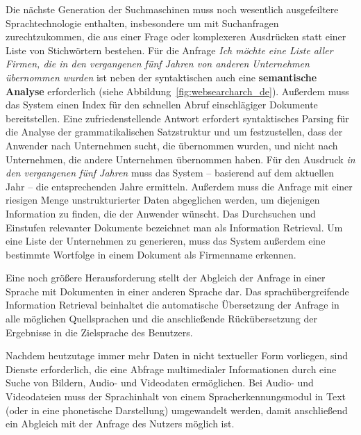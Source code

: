 \begin{multicols}{2}
Die nächste Generation der Suchmaschinen muss noch wesentlich ausgefeiltere Sprachtechnologie enthalten, insbesondere um mit Suchanfragen zurechtzukommen, die aus einer Frage oder komplexeren Ausdrücken statt einer Liste von Stichwörtern bestehen. Für die Anfrage \textit{Ich möchte eine Liste aller Firmen, die in den vergangenen fünf Jahren von anderen Unternehmen übernommen wurden} ist neben der syntaktischen auch eine \textbf{semantische Analyse} erforderlich (siehe Abbildung~\ref{fig:websearcharch_de}). Außerdem muss das System einen Index für den schnellen Abruf einschlägiger Dokumente bereitstellen. Eine zufriedenstellende Antwort erfordert syntaktisches Parsing für die Analyse der grammatikalischen Satzstruktur und um festzustellen, dass der Anwender nach Unternehmen sucht, die übernommen wurden, und nicht nach Unternehmen, die andere Unternehmen übernommen haben. Für den Ausdruck \textit{in den vergangenen fünf Jahren} muss das System -- basierend auf dem aktuellen Jahr -- die entsprechenden Jahre ermitteln. Außerdem muss die Anfrage mit einer riesigen Menge unstrukturierter Daten abgeglichen werden, um diejenigen Information zu finden, die der Anwender wünscht. Das Durchsuchen und Einstufen relevanter Dokumente bezeichnet man als Information Retrieval. Um eine Liste der Unternehmen zu generieren, muss das System außerdem eine bestimmte Wortfolge in einem Dokument als Firmenname erkennen.


Eine noch größere Herausforderung stellt der Abgleich der Anfrage in einer Sprache mit Dokumenten in einer anderen Sprache dar. Das sprachübergreifende Information Retrieval beinhaltet die automatische Übersetzung der Anfrage in alle möglichen Quellsprachen und die anschließende Rückübersetzung der Ergebnisse in die Zielsprache des Benutzers. 

Nachdem heutzutage immer mehr Daten in nicht textueller Form vorliegen, sind Dienste erforderlich, die eine Abfrage multimedialer Informationen durch eine Suche von Bildern, Audio- und Videodaten ermöglichen. Bei Audio- und Videodateien muss der Sprachinhalt von einem Spracherkennungsmodul in Text (oder in eine phonetische Darstellung) umgewandelt werden, damit anschließend ein Abgleich mit der Anfrage des Nutzers möglich ist.


\end{multicols}
